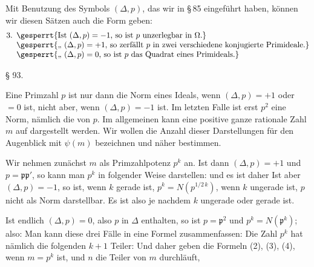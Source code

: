 Mit Benutzung des Symbols $(\Delta, p)$, das wir in §\,85 eingeführt haben, können wir diesen Sätzen auch die Form geben:
\[
\begin{array}{@{}l@{\enspace}l@{}}
\text{3.} & \gesperrt{\text{Ist } \ensuremath{(\Delta, p) = -1} \text{, so ist } \ensuremath{p} \text{ unzerlegbar in } \ensuremath{\Omega}\text{.}} \\
 & \gesperrt{\text{„} \ \ensuremath{(\Delta, p) = +1} \text{, so zerfällt } \ensuremath{p} \text{ in zwei verschiedene konjugierte Primideale.}} \\
 & \gesperrt{\text{„} \ \ensuremath{(\Delta, p) = 0} \text{, so ist } \ensuremath{p} \text{ das Quadrat eines Primideals.}}
\end{array}
\]

\begin{center}
§ 93. 
\end{center}

Eine Primzahl $p$ ist nur dann die Norm eines Ideals, wenn
$(\Delta, p) = +1$ oder $= 0$ ist, nicht aber, wenn $(\Delta, p) = -1$ ist.
Im letzten Falle ist erst $p^2$ eine Norm, nämlich die von $p$. Im
allgemeinen kann eine positive ganze rationale Zahl $m$ auf  dargestellt werden. Wir wollen die Anzahl
dieser Darstellungen für den Augenblick mit $\psi(m)$ bezeichnen
und näher bestimmen.

Wir nehmen zunächst $m$ als Primzahlpotenz $p^k$ an. Ist dann
$(\Delta, p) = +1$ und $p = \mathfrak{p}\mathfrak{p}'$, so kann man $p^k$ in folgender Weise
darstellen:
und es ist daher
Ist aber $(\Delta, p) = -1$, so ist, wenn $k$ gerade ist, $p^k = N(p^{1/2\,k})$,
wenn $k$ ungerade ist, $p$ nicht als Norm darstellbar. Es ist also
je nachdem $k$ ungerade oder gerade ist.

Ist endlich $(\Delta, p) = 0$, also $p$ in $\Delta$ enthalten, so ist $p = \mathfrak{p}^2$
und $p^k = N(\mathfrak{p}^k)$; also:
Man kann diese drei Fälle in eine Formel zusammenfassen:
Die Zahl $p^k$ hat nämlich die folgenden $k+1$ Teiler:
Und daher geben die Formeln (2), (3), (4), wenn $m = p^k$ ist,
und $n$ die Teiler von $m$ durchläuft,
